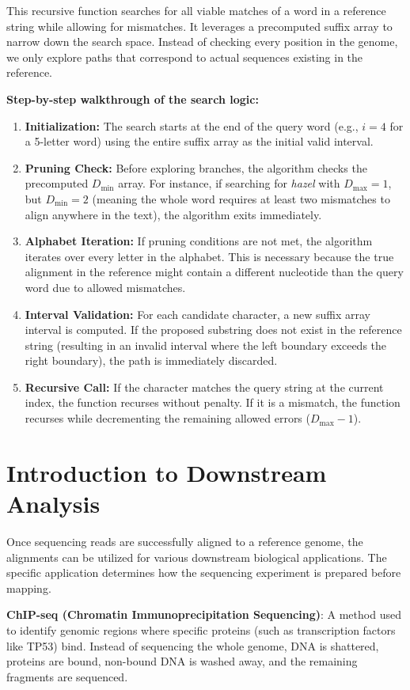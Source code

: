 \documentclass[11pt,a4paper]{article}
\begin{document}
This recursive function searches for all viable matches of a word in a reference string while allowing for mismatches. It leverages a precomputed suffix array to narrow down the search space. Instead of checking every position in the genome, we only explore paths that correspond to actual sequences existing in the reference.

\textbf{Step-by-step walkthrough of the search logic:}
\begin{enumerate}
    \item \textbf{Initialization:} The search starts at the end of the query word (e.g., $i=4$ for a 5-letter word) using the entire suffix array as the initial valid interval.
    \item \textbf{Pruning Check:} Before exploring branches, the algorithm checks the precomputed $D_{\min}$ array. For instance, if searching for \textit{hazel} with $D_{\max}=1$, but $D_{\min} = 2$ (meaning the whole word requires at least two mismatches to align anywhere in the text), the algorithm exits immediately.
    \item \textbf{Alphabet Iteration:} If pruning conditions are not met, the algorithm iterates over every letter in the alphabet. This is necessary because the true alignment in the reference might contain a different nucleotide than the query word due to allowed mismatches.
    \item \textbf{Interval Validation:} For each candidate character, a new suffix array interval is computed. If the proposed substring does not exist in the reference string (resulting in an invalid interval where the left boundary exceeds the right boundary), the path is immediately discarded. 
    \item \textbf{Recursive Call:} If the character matches the query string at the current index, the function recurses without penalty. If it is a mismatch, the function recurses while decrementing the remaining allowed errors ($D_{\max} - 1$).
\end{enumerate}

\section{Introduction to Downstream Analysis}
Once sequencing reads are successfully aligned to a reference genome, the alignments can be utilized for various downstream biological applications. The specific application determines how the sequencing experiment is prepared before mapping.

\begin{important}
    \textbf{ChIP-seq (Chromatin Immunoprecipitation Sequencing)}: A method used to identify genomic regions where specific proteins (such as transcription factors like TP53) bind. Instead of sequencing the whole genome, DNA is shattered, proteins are bound, non-bound DNA is washed away, and the remaining fragments are sequenced.
\end{important}
\end{document}
